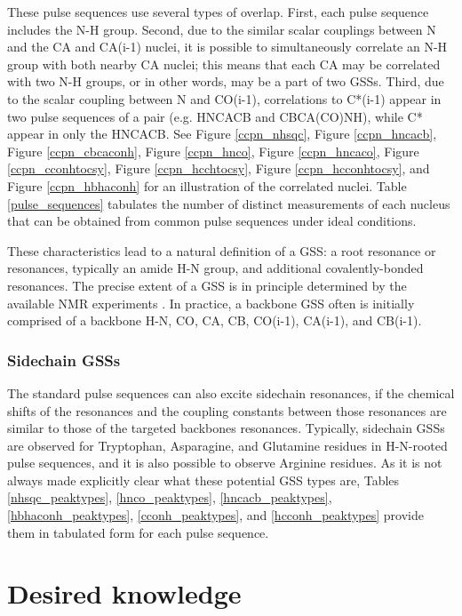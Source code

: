 These pulse sequences use several types of overlap.  First, each pulse sequence
includes the N-H group.  Second, due to the similar scalar couplings between
N and the CA and CA(i-1) nuclei, it is possible to simultaneously correlate an
N-H group with both nearby CA nuclei; this means that each CA may be correlated
with two N-H groups, or in other words, may be a part of two GSSs. 
Third, due to the scalar coupling between N and CO(i-1), correlations to 
C*(i-1) appear in two pulse sequences of a pair (e.g. HNCACB and CBCA(CO)NH), 
while C* appear in only the HNCACB.  See Figure \ref{ccpn_nhsqc}, 
Figure \ref{ccpn_hncacb}, Figure \ref{ccpn_cbcaconh}, Figure \ref{ccpn_hnco}, 
Figure \ref{ccpn_hncaco}, Figure \ref{ccpn_cconhtocsy}, Figure \ref{ccpn_hcchtocsy},
Figure \ref{ccpn_hcconhtocsy}, and Figure \ref{ccpn_hbhaconh} for an 
illustration of the correlated nuclei.  Table \ref{pulse_sequences} tabulates
the number of distinct measurements of each nucleus that can be obtained from
common pulse sequences under ideal conditions.

These characteristics lead to a natural definition of a GSS: a root 
resonance or resonances, typically an amide H-N group, and additional 
covalently-bonded resonances.  The precise extent of a GSS is in principle 
determined by the available NMR experiments \cite{hncacb, hnco, cbcaconh}.  
In practice, a backbone GSS often is initially 
comprised of a backbone H-N, CO, CA, CB, CO(i-1), CA(i-1), and CB(i-1).

\subsubsection{Sidechain GSSs}
The standard pulse sequences can also excite sidechain resonances, if the 
chemical shifts of the resonances and the coupling constants between those
resonances are similar to those of the targeted backbones resonances.
Typically, sidechain GSSs are observed for Tryptophan, Asparagine, and Glutamine
residues in H-N-rooted pulse sequences, and it is also possible to observe
Arginine residues.
As it is not always made explicitly clear what these potential GSS types
are, Tables \ref{nhsqc_peaktypes}, \ref{hnco_peaktypes}, 
\ref{hncacb_peaktypes}, \ref{hbhaconh_peaktypes}, \ref{cconh_peaktypes}, and
\ref{hcconh_peaktypes} provide them in tabulated form for each pulse sequence.


\section{Desired knowledge}

